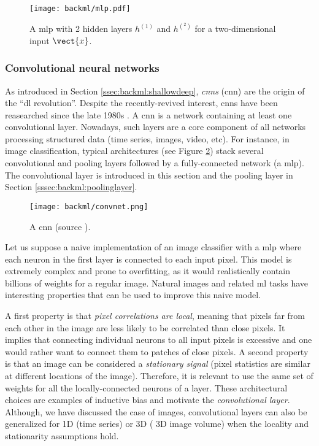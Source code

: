 \begin{figure}
  \centering
  \texttt{[image: backml/mlp.pdf]}
  \caption{A \acrlong{mlp} with 2 hidden layers $h^{(1)}$ and $h^{(^2)}$ for a two-dimensional input $\vect{x}$.}
  \label{fig:backml:mlp}
\end{figure}

\subsubsection{Convolutional neural networks}
\label{sssec:backml:dl:cnn}

As introduced in Section \ref{ssec:backml:shallowdeep}, \textit{\acrlong{cnn}s}
(\acrshort{cnn}) are the origin of the ``\acrlong{dl} revolution''. Despite the
recently-revived interest, \acrshort{cnn}s have been reasearched since the late
1980s \parencite{lecun1989handwritten}. A \acrshort{cnn} is a network containing
at least one convolutional layer. Nowadays, such layers are a core component of
all networks processing structured data (time series, images, video, etc). For
instance, in image classification, typical architectures (see Figure \ref{fig:backml:cnn})
stack several convolutional and pooling layers followed by a fully-connected
network (\ie a \acrshort{mlp}). The convolutional layer is introduced in this
section and the pooling layer in Section \ref{sssec:backml:poolinglayer}.

\begin{figure}
 \centering
 \texttt{[image: backml/convnet.png]}
 \caption{A \acrlong{cnn} (source \parencite{millar2019using}).}
 \label{fig:backml:cnn}
\end{figure}

Let us suppose a naive implementation of an image classifier with a \acrshort{mlp}
where each neuron in the first layer is connected to each input pixel. This model
is extremely complex and prone to overfitting, as it would realistically contain
billions of weights for a regular image. Natural images and related \acrlong{ml}
tasks have interesting properties that can be used to improve this naive model.

A first property is that \textit{pixel correlations are local}, meaning that pixels
far from each other in the image are less likely to be correlated than close
pixels. It implies that connecting individual neurons to all input pixels is
excessive and one would rather want to connect them to patches of close pixels.
A second property is that an image can be considered a \textit{stationary signal}
(\ie pixel statistics are similar at different locations of the image). Therefore,
it is relevant to use the same set of weights for all the locally-connected neurons
of a layer. These architectural choices are examples of inductive bias and motivate
the \textit{convolutional layer}. Although, we have discussed the case of images,
convolutional layers can also be generalized for 1D (\eg time series) or 3D (\eg
3D image volume) when the locality and stationarity assumptions hold.

